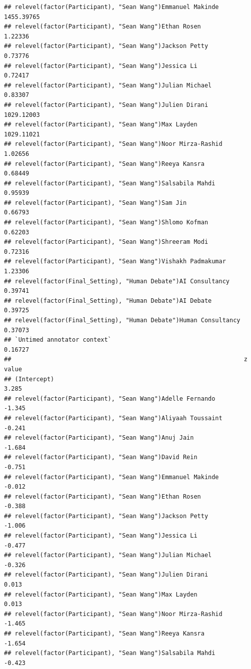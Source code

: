 \documentclass[
]{article}
\begin{document}
\begin{verbatim}
## relevel(factor(Participant), "Sean Wang")Emmanuel Makinde       1455.39765
## relevel(factor(Participant), "Sean Wang")Ethan Rosen               1.22336
## relevel(factor(Participant), "Sean Wang")Jackson Petty             0.73776
## relevel(factor(Participant), "Sean Wang")Jessica Li                0.72417
## relevel(factor(Participant), "Sean Wang")Julian Michael            0.83307
## relevel(factor(Participant), "Sean Wang")Julien Dirani          1029.12003
## relevel(factor(Participant), "Sean Wang")Max Layden             1029.11021
## relevel(factor(Participant), "Sean Wang")Noor Mirza-Rashid         1.02656
## relevel(factor(Participant), "Sean Wang")Reeya Kansra              0.68449
## relevel(factor(Participant), "Sean Wang")Salsabila Mahdi           0.95939
## relevel(factor(Participant), "Sean Wang")Sam Jin                   0.66793
## relevel(factor(Participant), "Sean Wang")Shlomo Kofman             0.62203
## relevel(factor(Participant), "Sean Wang")Shreeram Modi             0.72316
## relevel(factor(Participant), "Sean Wang")Vishakh Padmakumar        1.23306
## relevel(factor(Final_Setting), "Human Debate")AI Consultancy       0.39741
## relevel(factor(Final_Setting), "Human Debate")AI Debate            0.39725
## relevel(factor(Final_Setting), "Human Debate")Human Consultancy    0.37073
## `Untimed annotator context`                                        0.16727
##                                                                 z value
## (Intercept)                                                       3.285
## relevel(factor(Participant), "Sean Wang")Adelle Fernando         -1.345
## relevel(factor(Participant), "Sean Wang")Aliyaah Toussaint       -0.241
## relevel(factor(Participant), "Sean Wang")Anuj Jain               -1.684
## relevel(factor(Participant), "Sean Wang")David Rein              -0.751
## relevel(factor(Participant), "Sean Wang")Emmanuel Makinde        -0.012
## relevel(factor(Participant), "Sean Wang")Ethan Rosen             -0.388
## relevel(factor(Participant), "Sean Wang")Jackson Petty           -1.006
## relevel(factor(Participant), "Sean Wang")Jessica Li              -0.477
## relevel(factor(Participant), "Sean Wang")Julian Michael          -0.326
## relevel(factor(Participant), "Sean Wang")Julien Dirani            0.013
## relevel(factor(Participant), "Sean Wang")Max Layden               0.013
## relevel(factor(Participant), "Sean Wang")Noor Mirza-Rashid       -1.465
## relevel(factor(Participant), "Sean Wang")Reeya Kansra            -1.654
## relevel(factor(Participant), "Sean Wang")Salsabila Mahdi         -0.423

\end{verbatim}
\end{document}
